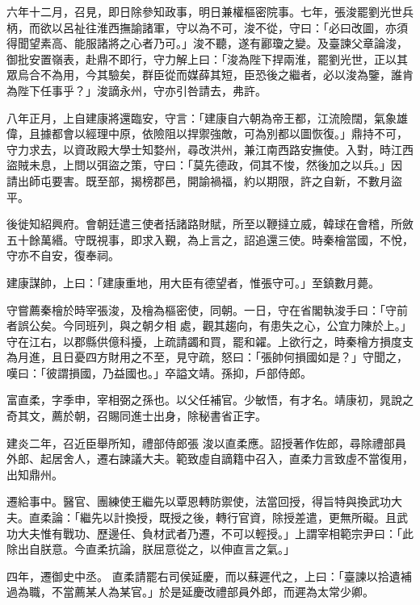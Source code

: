 \begin{pinyinscope}
 六年十二月，召見，即日除參知政事，明日兼權樞密院事。七年，張浚罷劉光世兵柄，而欲以呂祉往淮西撫諭諸軍，守以為不可，浚不從，守曰：「必曰改圖，亦須得聞望素高、能服諸將之心者乃可。」浚不聽，遂有酈瓊之變。及臺諫父章論浚，御批安置嶺表，赴鼎不即行，守力解上曰：「浚為陛下捍兩淮，罷劉光世，正以其
 眾烏合不為用，今其驗矣，群臣從而媒薛其短，臣恐後之繼者，必以浚為鑒，誰肯為陛下任事乎？」浚謫永州，守亦引咎請去，弗許。



 八年正月，上自建康將還臨安，守言：「建康自六朝為帝王都，江流險闊，氣象雄偉，且據都會以經理中原，依險阻以捍禦強敵，可為別都以圖恢復。」鼎持不可，守力求去，以資政殿大學士知婺州，尋改洪州，兼江南西路安撫使。入對，時江西盜賊未息，上問以弭盜之策，守曰：「莫先德政，伺其不悛，然後加之以兵。」因
 請出師屯要害。既至部，揭榜郡邑，開諭禍福，約以期限，許之自新，不數月盜平。



 後徙知紹興府。會朝廷遣三使者括諸路財賦，所至以鞭撻立威，韓球在會稽，所斂五十餘萬緡。守既視事，即求入覲，為上言之，詔追還三使。時秦檜當國，不悅，守亦不自安，復奉祠。



 建康謀帥，上曰：「建康重地，用大臣有德望者，惟張守可。」至鎮數月薨。



 守嘗薦秦檜於時宰張浚，及檜為樞密使，同朝。一日，守在省閣執浚手曰：「守前者誤公矣。今同班列，與之朝夕相
 處，觀其趨向，有患失之心，公宜力陳於上。」守在江右，以郡縣供億科擾，上疏請蠲和買，罷和糴。上欲行之，時秦檜方損度支為月進，且日憂四方財用之不至，見守疏，怒曰：「張帥何損國如是？」守聞之，嘆曰：「彼謂損國，乃益國也。」卒謚文靖。孫抑，戶部侍郎。



 富直柔，字季申，宰相弼之孫也。以父任補官。少敏悟，有才名。靖康初，晁說之奇其文，薦於朝，召賜同進士出身，除秘書省正字。



 建炎二年，召近臣舉所知，禮部侍郎張
 浚以直柔應。詔授著作佐郎，尋除禮部員外郎、起居舍人，遷右諫議大夫。範致虛自謫籍中召入，直柔力言致虛不當復用，出知鼎州。



 遷給事中。醫官、團練使王繼先以覃恩轉防禦使，法當回授，得旨特與換武功大夫。直柔論：「繼先以計換授，既授之後，轉行官資，除授差遣，更無所礙。且武功大夫惟有戰功、歷邊任、負材武者乃遷，不可以輕授。」上謂宰相範宗尹曰：「此除出自朕意。今直柔抗論，朕屈意從之，以伸直言之氣。」



 四年，遷御史中丞。
 直柔請罷右司侯延慶，而以蘇遲代之，上曰：「臺諫以拾遺補過為職，不當薦某人為某官。」於是延慶改禮部員外郎，而遲為太常少卿。




\end{pinyinscope}
